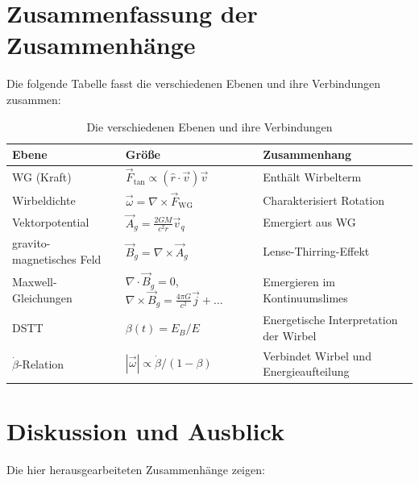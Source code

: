 \documentclass[12pt,a4paper]{article}
\begin{document}
\section{Zusammenfassung der Zusammenhänge}

Die folgende Tabelle fasst die verschiedenen Ebenen und ihre Verbindungen zusammen:

\begin{table}[h]
\centering
\begin{tabular}{|l|l|l|}
\hline
\textbf{Ebene} & \textbf{Größe} & \textbf{Zusammenhang} \\
\hline
WG (Kraft) & \(\vec{F}_{\text{tan}} \propto (\hat{r}\cdot\vec{v})\vec{v}\) & Enthält Wirbelterm \\
Wirbeldichte & \(\vec{\omega} = \nabla \times \vec{F}_{\text{WG}}\) & Charakterisiert Rotation \\
Vektorpotential & \(\vec{A}_g = \frac{2GM}{c^2 r} \vec{v}_q\) & Emergiert aus WG \\
gravito-magnetisches Feld & \(\vec{B}_g = \nabla \times \vec{A}_g\) & Lense-Thirring-Effekt \\
Maxwell-Gleichungen & \(\nabla \cdot \vec{B}_g = 0\), \(\nabla \times \vec{B}_g = \frac{4\pi G}{c^2}\vec{j} + \dots\) & Emergieren im Kontinuumslimes \\
DSTT & \(\beta(t) = E_B/E\) & Energetische Interpretation der Wirbel \\
\(\dot{\beta}\)-Relation & \(|\vec{\omega}| \propto \dot{\beta}/(1-\beta)\) & Verbindet Wirbel und Energieaufteilung \\
\hline
\end{tabular}
\caption{Die verschiedenen Ebenen und ihre Verbindungen}
\end{table}

\section{Diskussion und Ausblick}

Die hier herausgearbeiteten Zusammenhänge zeigen:
\end{document}
